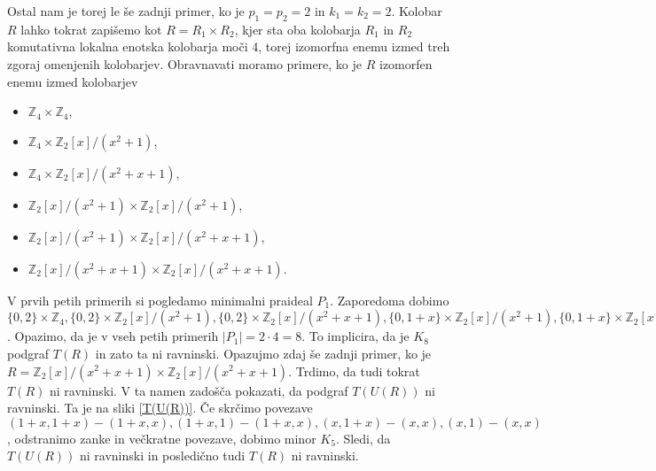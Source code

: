 \documentclass[a4paper, 12pt]{amsart}
\theoremstyle{definition} %
\theoremstyle{plain} %
\newcommand{\Z}{\mathbb Z}
\begin{document}
\begin{enumerate}
Ostal nam je torej le še zadnji primer, ko je $p_1 = p_2 = 2$ in $k_1 = k_2 = 2$. Kolobar $R$ lahko tokrat zapišemo kot $R=R_1 \times R_2$, kjer sta oba kolobarja $R_1$ in $R_2$ komutativna lokalna enotska kolobarja moči 4, torej izomorfna enemu izmed treh zgoraj omenjenih kolobarjev. Obravnavati moramo primere, ko je $R$ izomorfen enemu izmed kolobarjev
\begin{itemize}
\item $\Z_4 \times \Z_4$,
\item $\Z_4 \times \Z_2[x]/(x^2 + 1)$,
\item $\Z_4 \times \Z_2[x] / (x^2 + x+ 1)$,
\item $\Z_2[x]/(x^2+1) \times \Z_2[x]/(x^2+1)$,
\item $\Z_2[x]/(x^2+1) \times \Z_2[x]/(x^2 + x+ 1)$,
\item $\Z_2[x]/(x^2 + x + 1) \times \Z_2[x] / (x^2+x+1)$.
\end{itemize}

V prvih petih primerih si pogledamo minimalni praideal $P_1$. Zaporedoma dobimo $\{0,2\} \times \Z_4, \{0,2\}\times \Z_2[x]/(x^2 + 1), \{0,2\} \times \Z_2[x]/(x^2 + x+1), \{0,1+x\} \times \Z_2[x]/(x^2 + 1), \{0,1+x\} \times \Z_2[x]/(x^2 + x+1)$. Opazimo, da je v vseh petih primerih $|P_1| = 2\cdot 4 = 8$. To implicira, da je $K_8$ podgraf $T(R)$ in zato ta ni ravninski. 
Opazujmo zdaj še zadnji primer, ko je  $R = \Z_2[x]/(x^2 + x + 1) \times \Z_2[x] / (x^2+x+1)$. Trdimo, da tudi tokrat $T(R)$ ni ravninski. V ta namen zadošča pokazati, da podgraf $T(U(R))$ ni ravninski. Ta je na sliki \ref{T(U(R))}. Če skrčimo povezave $(1+x,1+x)-(1+x,x), (1+x,1)-(1+x,x), (x,1+x)-(x,x), (x,1)-(x,x)$, odstranimo zanke in večkratne povezave, dobimo minor $K_5$. Sledi, da $T(U(R))$ ni ravninski in posledično tudi $T(R)$ ni ravninski. 

\begin{figure}[h!]
\centering
\end{figure}
\end{enumerate}
\end{document}
